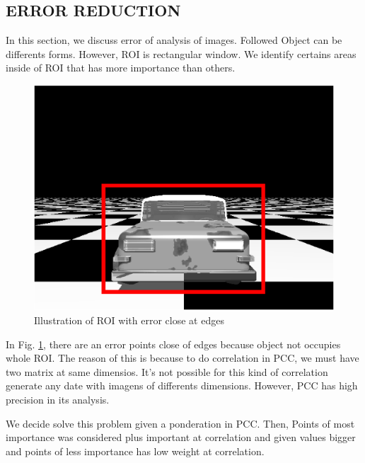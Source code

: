 \subsection{ERROR REDUCTION}

In this section, we discuss error of analysis of images. Followed Object can be differents forms. However, 
ROI is rectangular window. We identify certains areas inside of ROI that has more importance than others.

\begin{figure}[H]
\includegraphics[width=\columnwidth]{images/imageError.eps}
\caption{Illustration of ROI with error close at edges}
\label{fig:erroridentified}
\end{figure}

In Fig. \ref{fig:erroridentified}, there are an error points close of edges because object not occupies whole ROI. The reason of this is
because to do correlation in PCC, we must have two matrix at same dimensios. It's not possible for this kind of correlation 
generate any date with imagens of differents dimensions. However, PCC has high precision in its analysis.

We decide solve this problem given a ponderation in PCC. Then, Points of most importance was considered plus important 
at correlation and given values bigger and points of less importance has low weight at correlation.

